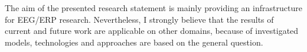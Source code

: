 \documentclass[a4paper, 10pt]{article}
\begin{document}
The aim of the presented research statement is mainly providing an infrastructure for EEG/ERP research. Nevertheless, I strongly believe that the results of current and future work are applicable on other domains, because of investigated models, technologies and approaches are based on the general question.



{}

\end{document}
